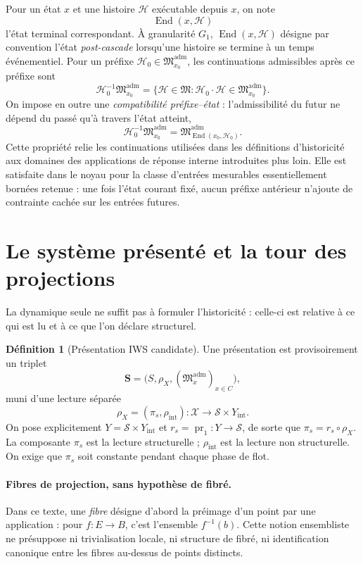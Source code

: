\documentclass[11pt,a4paper]{article}
\theoremstyle{definition}
\newtheorem{definition}{Définition}[section]
\theoremstyle{remark}
\newcommand{\X}{\mathcal X}
\newcommand{\Sstruct}{\mathcal S}
\newcommand{\M}{\mathfrak M}
\newcommand{\Madm}{\mathfrak M^{\mathrm{adm}}}
\newcommand{\End}{\operatorname{End}}
\begin{document}
Pour un état $x$ et une histoire $\mathcal H$ exécutable depuis $x$, on note
\[
\End(x,\mathcal H)
\]
l'état terminal correspondant. À granularité $G_1$, $\End(x,\mathcal H)$ désigne par convention l'état \emph{post-cascade} lorsqu'une histoire se termine à un temps événementiel. Pour un préfixe $\mathcal H_0\in\Madm_{x_0}$, les continuations admissibles après ce préfixe sont
\[
\mathcal H_0^{-1}\Madm_{x_0}
=
\{\mathcal H\in\M:\mathcal H_0\cdot\mathcal H\in\Madm_{x_0}\}.
\]
On impose en outre une \emph{compatibilité préfixe--état} : l'admissibilité du futur ne dépend du passé qu'à travers l'état atteint,
\[
\boxed{
\mathcal H_0^{-1}\Madm_{x_0}
=
\Madm_{\End(x_0,\mathcal H_0)}.}
\]
Cette propriété relie les continuations utilisées dans les définitions d'historicité aux domaines des applications de réponse interne introduites plus loin. Elle est satisfaite dans le noyau pour la classe d'entrées mesurables essentiellement bornées retenue : une fois l'état courant fixé, aucun préfixe antérieur n'ajoute de contrainte cachée sur les entrées futures. 
\section{Le système présenté et la tour des projections}

La dynamique seule ne suffit pas à formuler l'historicité : celle-ci est relative à ce qui est lu et à ce que l'on déclare structurel.

\begin{definition}[Présentation IWS candidate]
Une présentation est provisoirement un triplet
\[
\mathbf S=\bigl(S,\rho_X,(\Madm_x)_{x\in C}\bigr),
\]
muni d'une lecture séparée
\[
\boxed{\rho_X=(\pi_s,\rho_{\mathrm{int}}):\X\longrightarrow \Sstruct\times Y_{\mathrm{int}}.}
\]
On pose explicitement $Y=\Sstruct\times Y_{\mathrm{int}}$ et $r_s=\operatorname{pr}_1:Y\to\Sstruct$, de sorte que $\pi_s=r_s\circ\rho_X$. La composante $\pi_s$ est la lecture structurelle ; $\rho_{\mathrm{int}}$ est la lecture non structurelle. On exige que $\pi_s$ soit constante pendant chaque phase de flot.
\end{definition}

\paragraph{Fibres de projection, sans hypothèse de fibré.}
Dans ce texte, une \emph{fibre} désigne d'abord la préimage d'un point par une application : pour $f:E\to B$, c'est l'ensemble $f^{-1}(b)$. Cette notion ensembliste ne présuppose ni trivialisation locale, ni structure de fibré, ni identification canonique entre les fibres au-dessus de points distincts.
\end{document}
